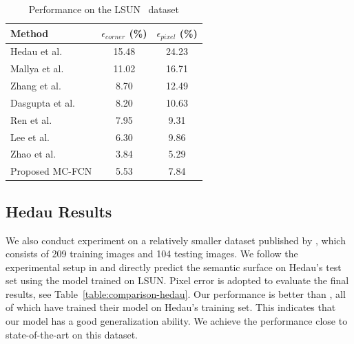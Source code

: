 \begin{table}
	\centering 
	\begin{tabular}{lcc}
		\toprule
		Method & $\epsilon_{corner}$ (\%) & $\epsilon_{pixel}$ (\%) \\
		\midrule
		Hedau et al.~\cite{hedau2009recovering} & 15.48 & 24.23 \\
		Mallya et al.~\cite{mallya2015learning} & 11.02 & 16.71 \\
		Zhang et al.~\cite{zhang2017learning} & 8.70 & 12.49 \\
		Dasgupta et al.~\cite{dasgupta2016delay} & 8.20 & 10.63 \\
		Ren et al.~\cite{ren2016coarse} & 7.95 & 9.31 \\
		Lee et al.~\cite{LeeRoomNet17} & 6.30 & 9.86 \\
		Zhao et al.~\cite{zhao2017physics} & 3.84 & 5.29 \\
		\midrule
		Proposed MC-FCN & 5.53 & 7.84 \\
		\bottomrule
	\end{tabular}
	\caption{Performance on the LSUN~\cite{zhang2015large} dataset}	
	\label{table:comparison-lsun}
\end{table}

\subsection{Hedau Results}
\label{sec:Hedau}
We also conduct experiment on a relatively smaller dataset published by \cite{hedau2009recovering}, which consists of 209 training images and 104 testing images. We follow the experimental setup in \cite{LeeRoomNet17} and directly predict the semantic surface on Hedau's test set using the model trained on LSUN. Pixel error is adopted to evaluate the final results, see Table~\ref{table:comparison-hedau}. Our performance is better than \cite{mallya2015learning,zhang2017learning,ren2016coarse}, all of which have trained their model on Hedau's training set. This indicates that our model has a good generalization ability. We achieve the performance close to state-of-the-art on this dataset.

